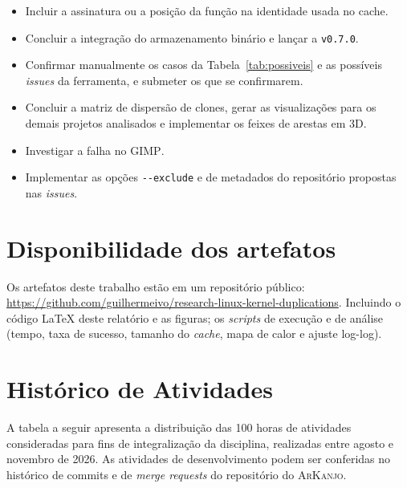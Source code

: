 \documentclass{article}
\newcommand{\scene}[2]{\todo[size=\tiny,color=blue!10]{#1 (#2)}}
\newcommand{\ark}{\textsc{ArKanjo}}
\begin{document}
\scene{Scene 7}{10:15--11:00}

\begin{itemize}
  \item Incluir a assinatura ou a posição da função na identidade usada no cache.
  \item Concluir a integração do armazenamento binário e lançar a \texttt{v0.7.0}.
  \item Confirmar manualmente os casos da Tabela~\ref{tab:possiveis} e as possíveis \textit{issues} da ferramenta, e submeter os que se confirmarem.
  \item Concluir a matriz de dispersão de clones, gerar as visualizações para os demais projetos analisados e implementar os feixes de arestas em 3D.
  \item Investigar a falha no \textsc{GIMP}.
  \item Implementar as opções \texttt{-{}-exclude} e de metadados do repositório propostas nas \textit{issues}.
\end{itemize}

\section*{Disponibilidade dos artefatos}\label{sec:artefatos}

Os artefatos deste trabalho estão em um repositório público: \url{https://github.com/guilhermeivo/research-linux-kernel-duplications}. Incluindo o código \LaTeX{} deste relatório e as figuras; os \textit{scripts} de execução e de análise (tempo, taxa de sucesso, tamanho do \textit{cache}, mapa de calor e ajuste log-log).

\clearpage




\clearpage
\appendix

\section{Histórico de Atividades}\label{sec:historico}

A tabela a seguir apresenta a distribuição das 100 horas de atividades consideradas para fins de integralização da disciplina, realizadas entre agosto e novembro de 2026. As atividades de desenvolvimento podem ser conferidas no histórico de commits e de \emph{merge requests} do repositório do \ark{}.
\end{document}
